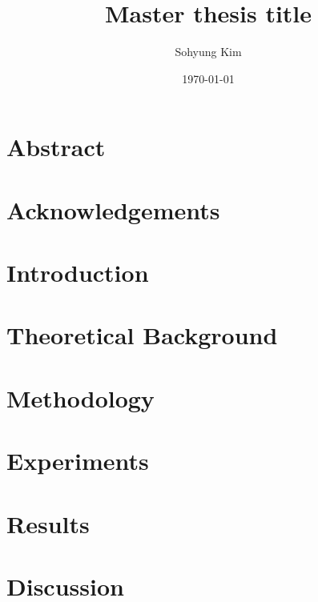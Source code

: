 \documentclass[12pt]{report}
\title{Master thesis title}
\author{Sohyung Kim}
\date{\today}
\newcommand{\blankpage}{
    \newpage
    \thispagestyle{empty}
    \mbox{}
    \newpage
}
\begin{document}

\blankpage


\chapter*{Abstract}
%

\chapter*{Acknowledgements}
%



\printnomenclature

\tableofcontents

\clearpage
{}

\chapter{Introduction}

\chapter{Theoretical Background} \label{chapter:theory}

\chapter{Methodology} \label{chapter:methodology}

\chapter{Experiments} \label{chapter:experiments}

\chapter{Results} \label{chapter:results}

\chapter{Discussion} \label{chapter:discussion}


\printbibliography

\appendix

\end{document}
